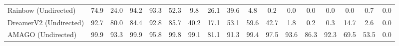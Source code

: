 \documentclass{article}
\begin{document}
\begin{table}[ht]
{\begin{tabular}{@{}lcccccccccccccccc@{}}
Rainbow (Undirected) \cite{hessel2018rainbow}             & 74.9                                                    & 24.0                                                     & 94.2                                                   & 93.3                                               & 52.3                                                   & 9.8                                                   & 26.1                                               & 39.6                                                     & 4.8                                                     & 0.2                                                      & 0.0                                                      & 0.0                                                      & 0.0                                                    & 0.0                                                     & 0.7                                                        & 0.0                                                              \\
DreamerV2 (Undirected)\cite{hafner2020mastering}            & 92.7                                                    & 80.0                                                     & 84.4                                                   & 92.8                                               & 85.7                                                   & 40.2                                                  & 17.1                                               & 53.1                                                     & 59.6                                                    & 42.7                                                     & 1.8                                                      & 0.2                                                      & 0.3                                                    & 14.7                                                    & 2.6                                                        & 0.0                                                              \\
AMAGO (Undirected)        & 99.9                                                    & 93.3                                                     & 99.9                                                   & 95.8                                               & 99.8                                                   & 99.1                                                  & 81.1                                               & 91.3                                                     & 99.4                                                    & 97.5                                                     & 93.6                                                     & 86.3                                                     & 92.3                                                   & 69.5                                                    & 53.5                                                       & 0.0                                                              \\ \midrule

\end{tabular}}
\end{table}
\end{document}

